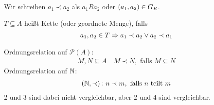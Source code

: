 \begin{notation}
    Wir schreiben $a_1\prec a_2$ als $a_{1}Ra_{2}$ oder $\left(a_1, a_2\right)\in G_R$.
\end{notation}
\begin{definition}[Kette]
    $T\subseteq A$ heißt Kette (oder geordnete Menge), falls
    \begin{align*}
        a_1, a_2\in T \Rightarrow{} a_1\prec a_2 \lor a_2 \prec a_1
    \end{align*}
\end{definition}

\begin{beispiel}[Ordnungsrelation]
    Ordnungsrelation auf $\mathcal{P}(A)$:
    \begin{align*}
        M, N \subseteq A \quad M \prec N, \text{ falls } M\subseteq N
    \end{align*}
    \noindent Ordnungsrelation auf $\mathbb{N}$:
    \begin{align*}
    (\mathbb{N}, \prec)
        : n\prec m, \text{ falls $n$ teilt $m$}
    \end{align*}
    $2$ und $3$ sind dabei nicht vergleichbar, aber $2$ und $4$ sind vergleichbar.
\end{beispiel}

\newpage